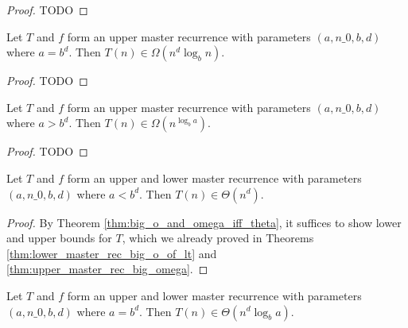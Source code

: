 \begin{proof}
    \notready
    TODO
\end{proof}

\begin{theorem}
    \label{thm:upper_master_rec_big_omega_of_eq}
    \leanok
    Let $T$ and $f$ form an upper master recurrence with parameters 
    $(a, n\_0, b, d)$ where $a = b^d$. Then $T(n) \in \Omega(n^d \log_b{n})$.
\end{theorem}

\begin{proof}
    \notready
    TODO
\end{proof}

\begin{theorem}
    \label{thm:upper_master_rec_big_omega_of_gt}
    \leanok
    Let $T$ and $f$ form an upper master recurrence with parameters 
    $(a, n\_0, b, d)$ where $a > b^d$. Then $T(n) \in \Omega(n^{\log_b{a}})$.
\end{theorem}

\begin{proof}
    \notready
    TODO
\end{proof}


\begin{corollary}
    \label{thm:master_rec_theta_of_lt}
    \leanok
    Let $T$ and $f$ form an upper and lower master recurrence with parameters 
    $(a, n\_0, b, d)$ where $a < b^d$. Then $T(n) \in \Theta(n^d)$.
\end{corollary}

\begin{proof}
    \leanok
    By Theorem \ref{thm:big_o_and_omega_iff_theta}, it suffices to show
    lower and upper bounds for $T$, which we already proved in Theorems
    \ref{thm:lower_master_rec_big_o_of_lt} and 
    \ref{thm:upper_master_rec_big_omega}.
\end{proof}

\begin{corollary}
    \label{thm:master_rec_theta_of_eq}
    \leanok
    Let $T$ and $f$ form an upper and lower master recurrence with parameters 
    $(a, n\_0, b, d)$ where $a = b^d$. Then $T(n) \in \Theta(n^d \log_b{a})$.
\end{corollary}

